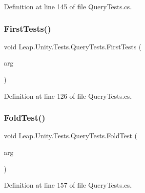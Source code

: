 Definition at line 145 of file Query\+Tests.\+cs.

\mbox{\label{class_leap_1_1_unity_1_1_tests_1_1_query_tests_a0573ebf5ac67a01f925590baa34c96d6}} 
\subsubsection{\texorpdfstring{FirstTests()}{FirstTests()}}
{\footnotesize\ttfamily void Leap.\+Unity.\+Tests.\+Query\+Tests.\+First\+Tests (\begin{DoxyParamCaption}\item[{\mbox{[}\+Value\+Source(\char`\"{}list0\char`\"{})\mbox{]} \mbox{\hyperlink{class_leap_1_1_unity_1_1_tests_1_1_query_tests_1_1_query_arg}{Query\+Arg}}}]{arg }\end{DoxyParamCaption})}



Definition at line 126 of file Query\+Tests.\+cs.

\mbox{\label{class_leap_1_1_unity_1_1_tests_1_1_query_tests_aa95430f50d25682e20764f3b131a299d}} 
\subsubsection{\texorpdfstring{FoldTest()}{FoldTest()}}
{\footnotesize\ttfamily void Leap.\+Unity.\+Tests.\+Query\+Tests.\+Fold\+Test (\begin{DoxyParamCaption}\item[{\mbox{[}\+Value\+Source(\char`\"{}list0\char`\"{})\mbox{]} \mbox{\hyperlink{class_leap_1_1_unity_1_1_tests_1_1_query_tests_1_1_query_arg}{Query\+Arg}}}]{arg }\end{DoxyParamCaption})}



Definition at line 157 of file Query\+Tests.\+cs.

\mbox{\label{class_leap_1_1_unity_1_1_tests_1_1_query_tests_a6d5935d2f07cd029f690bbbf146553a8}} 
